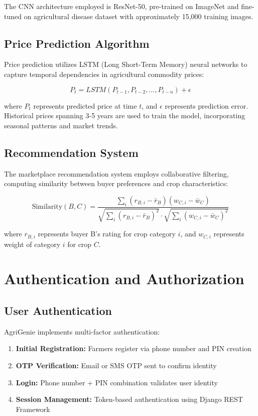 \documentclass[12pt,a4paper]{report}
\begin{document}
The CNN architecture employed is ResNet-50, pre-trained on ImageNet and fine-tuned on agricultural disease dataset with approximately 15,000 training images.

\subsection{Price Prediction Algorithm}

Price prediction utilizes LSTM (Long Short-Term Memory) neural networks to capture temporal dependencies in agricultural commodity prices:

$$P_t = LSTM(P_{t-1}, P_{t-2}, \ldots, P_{t-n}) + \epsilon$$

where $P_t$ represents predicted price at time $t$, and $\epsilon$ represents prediction error. Historical prices spanning 3-5 years are used to train the model, incorporating seasonal patterns and market trends.

\subsection{Recommendation System}

The marketplace recommendation system employs collaborative filtering, computing similarity between buyer preferences and crop characteristics:

$$\text{Similarity}(B, C) = \frac{\sum_{i} (r_{B,i} - \bar{r}_B)(w_{C,i} - \bar{w}_C)}{\sqrt{\sum_i (r_{B,i} - \bar{r}_B)^2} \cdot \sqrt{\sum_i (w_{C,i} - \bar{w}_C)^2}}$$

where $r_{B,i}$ represents buyer B's rating for crop category $i$, and $w_{C,i}$ represents weight of category $i$ for crop $C$.

\section{Authentication and Authorization}

\subsection{User Authentication}

AgriGenie implements multi-factor authentication:

\begin{enumerate}
    \item \textbf{Initial Registration:} Farmers register via phone number and PIN creation
    \item \textbf{OTP Verification:} Email or SMS OTP sent to confirm identity
    \item \textbf{Login:} Phone number + PIN combination validates user identity
    \item \textbf{Session Management:} Token-based authentication using Django REST Framework
\end{enumerate}
\end{document}
